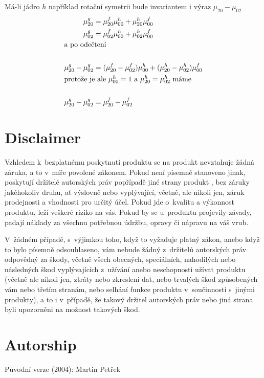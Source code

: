 Má-li jádro $h$ například rotační symetrii bude invariantem i výraz $\mu_{20}-\mu_{02}$ 
\begin{align}
\mu_{20}^g &= \mu_{20}^f\mu_{00}^h+\mu_{20}^h\mu_{00}^f\\
\mu_{02}^g &= \mu_{02}^f\mu_{00}^h+\mu_{02}^h\mu_{00}^f\\
\noalign{\hbox{a po odečtení}\nonumber}\\
\mu_{20}^g-\mu_{02}^g &= (\mu_{20}^f-\mu_{02}^f)\mu_{00}^h+(\mu_{20}^h-\mu_{02}^h)\mu_{00}^f\\
\noalign{\hbox{protože je ale $\mu_{00}^h=1$ a $\mu_{20}^h=\mu_{02}^h$ máme}\nonumber}\\
\mu_{20}^g-\mu_{02}^g &= \mu_{20}^f-\mu_{02}^f
\end{align}

\section*{Disclaimer}
{
\sc
Vzhledem k~bezplatnému poskytnutí produktu se na produkt
nevztahuje žádná záruka, a to v~míře povolené zákonem. Pokud není
písemně stanoveno jinak, poskytují držitelé autorských práv popřípadě
jiné strany produkt , bez záruky jakéhokoliv druhu, ať
výslovně nebo vyplývající, včetně, ale nikoli jen, záruk prodejnosti
a vhodnosti pro určitý účel. Pokud jde o~kvalitu a výkonnost produktu,
leží veškeré riziko na vás. Pokud by se u~produktu projevily závady,
padají náklady za všechnu potřebnou údržbu, opravy či nápravu na váš
vrub.

V~žádném případě, s~výjimkou toho, když to vyžaduje platný zákon, anebo
když to bylo písemně odsouhlaseno, vám nebude žádný z~držitelů
autorských práv odpovědný za škody,
včetně všech obecných, speciálních, nahodilých nebo následných škod
vyplývajících z~užívání anebo neschopnosti užívat produktu (včetně ale
nikoli jen, ztráty nebo zkreslení dat, nebo trvalých škod způsobených
vám nebo třetím stranám, nebo selhání funkce produktu v~součinnosti
s~jinými produkty), a to i v~případě, že takový držitel autorských práv
nebo jiná strana byli upozorněni na možnost takových škod.
}

\section*{Autorship}

Původní verze (2004): Martin Petřek

